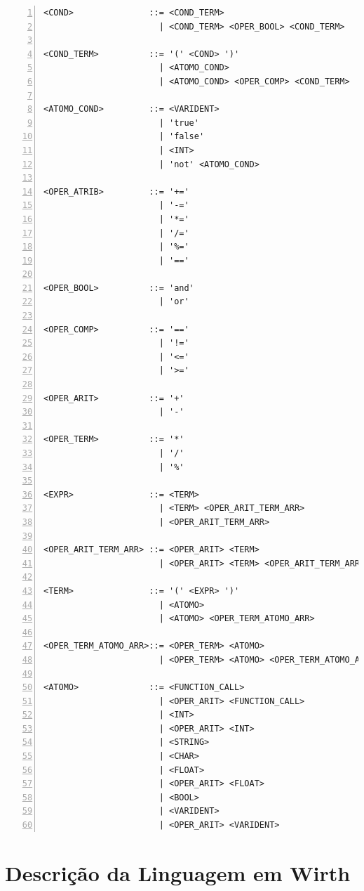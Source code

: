 \begin{lstlisting}[frame=single,numbers=left,breaklines=true,mathescape=true>,basicstyle=\ttfamily\scriptsize]
<COND>               ::= <COND_TERM> 
                       | <COND_TERM> <OPER_BOOL> <COND_TERM>

<COND_TERM>          ::= '(' <COND> ')' 
                       | <ATOMO_COND> 
                       | <ATOMO_COND> <OPER_COMP> <COND_TERM>

<ATOMO_COND>         ::= <VARIDENT> 
                       | 'true'
                       | 'false'
                       | <INT> 
                       | 'not' <ATOMO_COND>

<OPER_ATRIB>         ::= '+=' 
                       | '-=' 
                       | '*=' 
                       | '/=' 
                       | '%=' 
                       | '=='

<OPER_BOOL>          ::= 'and' 
                       | 'or'

<OPER_COMP>          ::= '==' 
                       | '!=' 
                       | '<=' 
                       | '>='

<OPER_ARIT>          ::= '+' 
                       | '-'

<OPER_TERM>          ::= '*' 
                       | '/' 
                       | '%'

<EXPR>               ::= <TERM> 
                       | <TERM> <OPER_ARIT_TERM_ARR>
                       | <OPER_ARIT_TERM_ARR>

<OPER_ARIT_TERM_ARR> ::= <OPER_ARIT> <TERM>
                       | <OPER_ARIT> <TERM> <OPER_ARIT_TERM_ARR>

<TERM>               ::= '(' <EXPR> ')'
                       | <ATOMO>
                       | <ATOMO> <OPER_TERM_ATOMO_ARR>

<OPER_TERM_ATOMO_ARR>::= <OPER_TERM> <ATOMO>
                       | <OPER_TERM> <ATOMO> <OPER_TERM_ATOMO_ARR>

<ATOMO>              ::= <FUNCTION_CALL>
                       | <OPER_ARIT> <FUNCTION_CALL>
                       | <INT>
                       | <OPER_ARIT> <INT>
                       | <STRING>
                       | <CHAR>
                       | <FLOAT>
                       | <OPER_ARIT> <FLOAT>
                       | <BOOL>
                       | <VARIDENT>
                       | <OPER_ARIT> <VARIDENT>
\end{lstlisting}

\section{Descrição da Linguagem em Wirth}
\label{sec:wirth}

